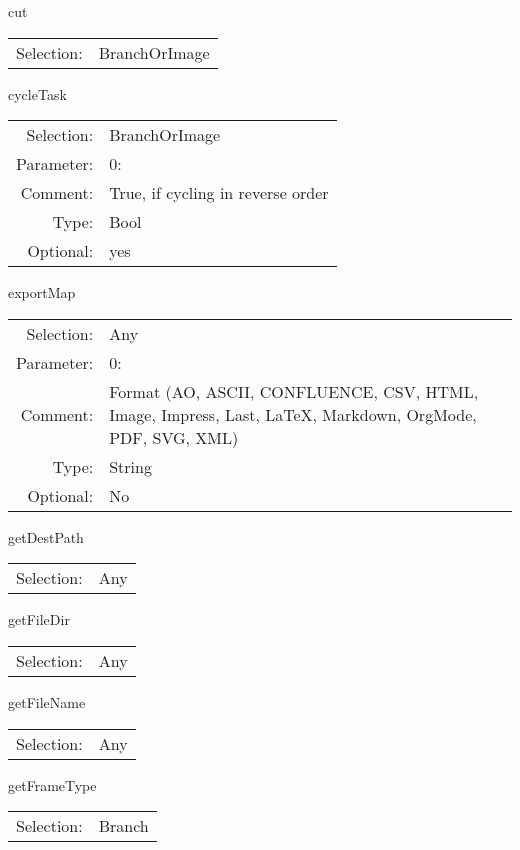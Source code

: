 \item cut\\
\begin{tabular}{rl}
  Selection: & BranchOrImage\\
\end{tabular}

\item cycleTask\\
\begin{tabular}{rl}
  Selection: & BranchOrImage\\
   Parameter: &  0:\\
        Comment: & True, if cycling in reverse order\\
           Type: & Bool\\
       Optional: &  yes\\
\end{tabular}

\item exportMap\\
\begin{tabular}{rl}
  Selection: & Any\\
   Parameter: &  0:\\
        Comment: & Format (AO, ASCII, CONFLUENCE, CSV, HTML, Image, Impress, Last, LaTeX, Markdown, OrgMode, PDF, SVG, XML)\\
           Type: & String\\
       Optional: &  No\\
\end{tabular}

\item getDestPath\\
\begin{tabular}{rl}
  Selection: & Any\\
\end{tabular}

\item getFileDir\\
\begin{tabular}{rl}
  Selection: & Any\\
\end{tabular}

\item getFileName\\
\begin{tabular}{rl}
  Selection: & Any\\
\end{tabular}

\item getFrameType\\
\begin{tabular}{rl}
  Selection: & Branch\\
\end{tabular}

